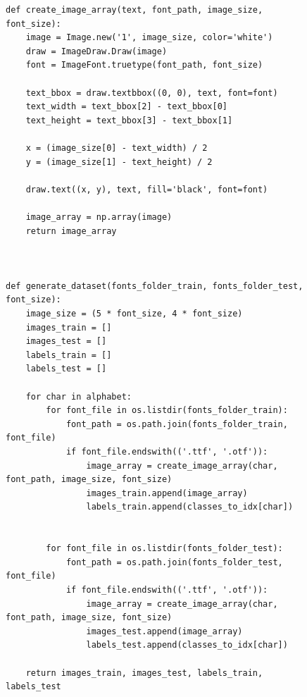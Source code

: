 \documentclass[a4paper, 14pt]{extarticle}
\begin{document}
\begin{figure}[H]
\begin{lstlisting}[language={},caption={Подготовка датасета},label={lst:code1}]
def create_image_array(text, font_path, image_size, font_size):
    image = Image.new('1', image_size, color='white')
    draw = ImageDraw.Draw(image)
    font = ImageFont.truetype(font_path, font_size)

    text_bbox = draw.textbbox((0, 0), text, font=font)
    text_width = text_bbox[2] - text_bbox[0]
    text_height = text_bbox[3] - text_bbox[1]

    x = (image_size[0] - text_width) / 2
    y = (image_size[1] - text_height) / 2

    draw.text((x, y), text, fill='black', font=font)

    image_array = np.array(image)
    return image_array



def generate_dataset(fonts_folder_train, fonts_folder_test, font_size):
    image_size = (5 * font_size, 4 * font_size)
    images_train = []
    images_test = []
    labels_train = []
    labels_test = []

    for char in alphabet:
        for font_file in os.listdir(fonts_folder_train):
            font_path = os.path.join(fonts_folder_train, font_file)
            if font_file.endswith(('.ttf', '.otf')):
                image_array = create_image_array(char, font_path, image_size, font_size)
                images_train.append(image_array)
                labels_train.append(classes_to_idx[char])


        for font_file in os.listdir(fonts_folder_test):
            font_path = os.path.join(fonts_folder_test, font_file)
            if font_file.endswith(('.ttf', '.otf')):
                image_array = create_image_array(char, font_path, image_size, font_size)
                images_test.append(image_array)
                labels_test.append(classes_to_idx[char])

    return images_train, images_test, labels_train, labels_test
\end{lstlisting}
\end{figure}
\end{document}
